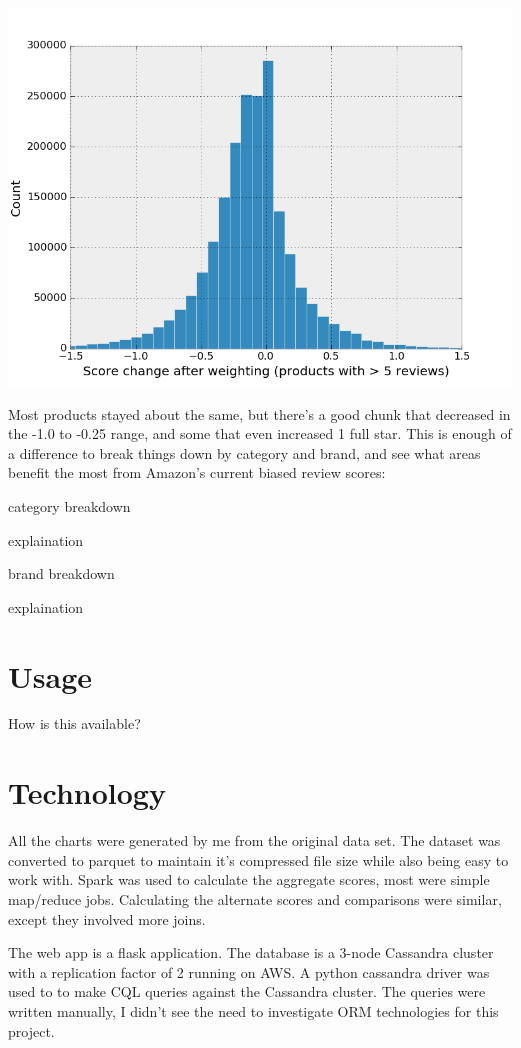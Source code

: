 \documentclass[a4paper,11pt]{article}
\begin{document}
\begin{center}
    \includegraphics[scale=0.65]{normascore_changes.png}
\end{center}

Most products stayed about the same, but there's a good chunk that decreased in the -1.0 to -0.25 range, and some that even increased 1 full star. This is enough of a difference to break things down by category and brand, and see what areas benefit the most from Amazon's current biased review scores:

category breakdown

explaination

brand breakdown

explaination

\section*{Usage}
How is this available?

\section*{Technology}
All the charts were generated by me from the original data set. The dataset was converted to parquet to maintain it's compressed file size while also being easy to work with. Spark was used to calculate the aggregate scores, most were simple map/reduce jobs. Calculating the alternate scores and comparisons were similar, except they involved more joins.

The web app is a flask application. The database is a 3-node Cassandra cluster with a replication factor of 2 running on AWS. A python cassandra driver was used to to make CQL queries against the Cassandra cluster. The queries were written manually, I didn't see the need to investigate ORM technologies for this project.
\end{document}
